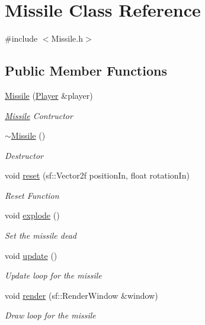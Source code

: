 \hypertarget{class_missile}{}\section{Missile Class Reference}
\label{class_missile}


{\ttfamily \#include $<$Missile.\+h$>$}

\subsection*{Public Member Functions}
\begin{DoxyCompactItemize}
\item 
\mbox{\hyperlink{class_missile_a69e2217677e4a23b74539f6a5a277bfb}{Missile}} (\mbox{\hyperlink{class_player}{Player}} \&player)
\begin{DoxyCompactList}\small\item\em \mbox{\hyperlink{class_missile}{Missile}} Contructor \end{DoxyCompactList}\item 
\mbox{\hyperlink{class_missile_ad42379e48a46ec3556056f98ce8bd912}{$\sim$\+Missile}} ()
\begin{DoxyCompactList}\small\item\em Destructor \end{DoxyCompactList}\item 
void \mbox{\hyperlink{class_missile_ac3e41d15fab89b6bf92b5437b039d5e3}{reset}} (sf\+::\+Vector2f position\+In, float rotation\+In)
\begin{DoxyCompactList}\small\item\em Reset Function \end{DoxyCompactList}\item 
void \mbox{\hyperlink{class_missile_a0f251515e9706d3377e81ef9f5563eb1}{explode}} ()
\begin{DoxyCompactList}\small\item\em Set the missile dead \end{DoxyCompactList}\item 
void \mbox{\hyperlink{class_missile_a2ef82438ddc6320bbdfb05227fed047b}{update}} ()
\begin{DoxyCompactList}\small\item\em Update loop for the missile \end{DoxyCompactList}\item 
void \mbox{\hyperlink{class_missile_a882289a30763d8307727a674655c7367}{render}} (sf\+::\+Render\+Window \&window)
\begin{DoxyCompactList}\small\item\em Draw loop for the missile \end{DoxyCompactList}\item 

\end{DoxyCompactItemize}
